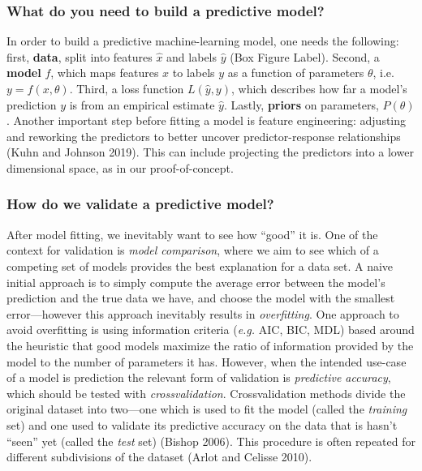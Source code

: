 \documentclass[11pt]{article}
\begin{document}
\hypertarget{what-do-you-need-to-build-a-predictive-model}{%
\subsubsection{What do you need to build a predictive
model?}\label{what-do-you-need-to-build-a-predictive-model}}

In order to build a predictive machine-learning model, one needs the
following: first, \textbf{data}, split into features \(\hat{x}\) and
labels \(\hat{y}\) (Box Figure Label). Second, a \textbf{model} \(f\),
which maps features \(x\) to labels \(y\) as a function of parameters
\(\theta\), i.e.~\(y = f(x, \theta)\). Third, a loss function
\(L(\hat{y}, y)\), which describes how far a model's prediction \(y\) is
from an empirical estimate \(\hat{y}\). Lastly, \textbf{priors} on
parameters, \(P(\theta)\). Another important step before fitting a model
is feature engineering: adjusting and reworking the predictors to better
uncover predictor-response relationships (Kuhn and Johnson 2019). This
can include projecting the predictors into a lower dimensional space, as
in our proof-of-concept.

\hypertarget{how-do-we-validate-a-predictive-model}{%
\subsubsection{How do we validate a predictive
model?}\label{how-do-we-validate-a-predictive-model}}

After model fitting, we inevitably want to see how ``good'' it is. One
of the context for validation is \emph{model comparison}, where we aim
to see which of a competing set of models provides the best explanation
for a data set. A naive initial approach is to simply compute the
average error between the model's prediction and the true data we have,
and choose the model with the smallest error---however this approach
inevitably results in \emph{overfitting}. One approach to avoid
overfitting is using information criteria (\emph{e.g.} AIC, BIC, MDL)
based around the heuristic that good models maximize the ratio of
information provided by the model to the number of parameters it has.
However, when the intended use-case of a model is prediction the
relevant form of validation is \emph{predictive accuracy}, which should
be tested with \emph{crossvalidation}. Crossvalidation methods divide
the original dataset into two---one which is used to fit the model
(called the \emph{training} set) and one used to validate its predictive
accuracy on the data that is hasn't ``seen'' yet (called the \emph{test}
set) (Bishop 2006). This procedure is often repeated for different
subdivisions of the dataset (Arlot and Celisse 2010).
\end{document}
